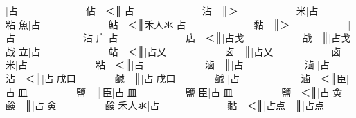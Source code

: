 {\cjk{}{\cnsym{}　　　　　}}|{\cjk{}占{\cnsym{}　　　　　　　}佔{\cnsym{}　}＜}║{\cjk{}{\cnsym{}　　　　　　}}|{\cjk{}占{\cnsym{}　　　　　　　}沾{\cnsym{}　}}║{\cjk{}＞{\cnsym{}　　　　　　}米}|{\cjk{}占{\cnsym{}　　　　　　　}粘} 
{\cjk{}{\cnsym{}　　　　　}魚}|{\cjk{}占{\cnsym{}　　　　　　　}鮎{\cnsym{}　}＜}║{\cjk{}{\cnsym{}　　　　}禾人氺}|{\cjk{}占{\cnsym{}　　　　　　　}黏{\cnsym{}　}}║{\cjk{}＞{\cnsym{}　　　　　　}}|{\cjk{}占{\cnsym{}　　　　　　　}沾} 
{\cjk{}{\cnsym{}　　　　　}广}|{\cjk{}占{\cnsym{}　　　　　　　}店{\cnsym{}　}＜}║{\cjk{}{\cnsym{}　　　　　　　}}|{\cjk{}占戈{\cnsym{}　　　　　　}战{\cnsym{}　}}║{\cjk{}{\cnsym{}　　　　　　　　}}|{\cjk{}占戈{\cnsym{}　　　　　　}战} 
{\cjk{}{\cnsym{}　　　　　}立}|{\cjk{}占{\cnsym{}　　　　　　　}站{\cnsym{}　}＜}║{\cjk{}{\cnsym{}　　　　　　　}}|{\cjk{}占乂{\cnsym{}　　　　　　}卤{\cnsym{}　}}║{\cjk{}{\cnsym{}　　　　　　　　}}|{\cjk{}占乂{\cnsym{}　　　　　　}卤} 
{\cjk{}{\cnsym{}　　　　　}米}|{\cjk{}占{\cnsym{}　　　　　　　}粘{\cnsym{}　}＜}║{\cjk{}{\cnsym{}　　　　　　}}|{\cjk{}占{\cnxb{}𠂭}{\cnsym{}　　　　　　}滷{\cnsym{}　}}║{\cjk{}{\cnsym{}　　　　　　　}}|{\cjk{}占{\cnxb{}𠂭}{\cnsym{}　　　　　　}滷} 
{\cjk{}{\cnsym{}　　　　　}}|{\cjk{}占{\cnsym{}　　　　　　　}沾{\cnsym{}　}＜}║{\cjk{}{\cnsym{}　　　　　　　}}|{\cjk{}占{\cnxb{}𠂭}戌口{\cnsym{}　　　　}鹹{\cnsym{}　}}║{\cjk{}{\cnsym{}　　　　　　　　}}|{\cjk{}占{\cnxb{}𠂭}戌口{\cnsym{}　　　　}鹹} 
{\cjk{}{\cnsym{}　　　　　}}|{\cjk{}占{\cnxb{}𠂭}{\cnsym{}　　　　　　}滷{\cnsym{}　}＜}║{\cjk{}{\cnsym{}　　　　　}臣}|{\cjk{}占{\cnxb{}𠂭}皿{\cnsym{}　　　　　}鹽{\cnsym{}　}}║{\cjk{}{\cnsym{}　　　　　　}臣}|{\cjk{}占{\cnxb{}𠂭}皿{\cnsym{}　　　　　}鹽} 
{\cjk{}{\cnsym{}　　　　}臣}|{\cjk{}占{\cnxb{}𠂭}皿{\cnsym{}　　　　　}鹽{\cnsym{}　}＜}║{\cjk{}{\cnsym{}　　　　　　　}}|{\cjk{}占{\cnxb{}𠂭}{\cnxa{}㑒}{\cnsym{}　　　　　}鹸{\cnsym{}　}}║{\cjk{}{\cnsym{}　　　　　　　　}}|{\cjk{}占{\cnxb{}𠂭}{\cnxa{}㑒}{\cnsym{}　　　　　}鹸} 
{\cjk{}{\cnsym{}　　　}禾人氺}|{\cjk{}占{\cnsym{}　　　　　　　}黏{\cnsym{}　}＜}║{\cjk{}{\cnsym{}　　　　　　　}}|{\cjk{}占点{\cnsym{}　}}║{\cjk{}{\cnsym{}　　　　　　　　}}|{\cjk{}占点} 
\endgroup{}{}

